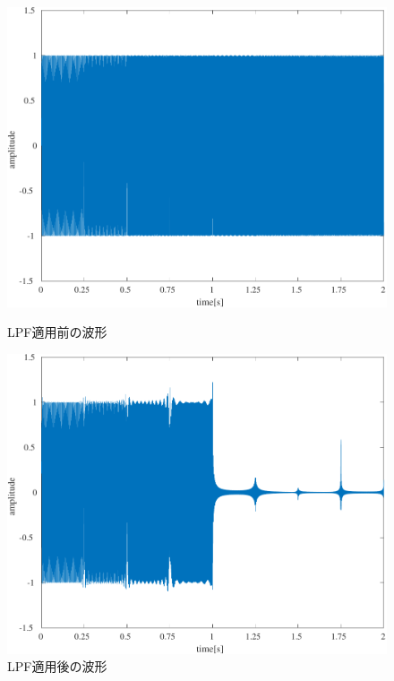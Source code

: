 \begin{figure}[h]
    \centering
    \begin{minipage}[b]{.3\textwidth}
        \centering
        \includegraphics[keepaspectratio,width=\textwidth]{../../Figures/02_20.pdf}
        \caption{LPF適用前の波形}
        \label{fig:LPF適用前の波形}
    \end{minipage}
    \begin{minipage}[b]{.3\textwidth}
        \centering
        \includegraphics[keepaspectratio,width=\textwidth]{../../Figures/02_22.pdf}
        \caption{LPF適用後の波形}
        \label{fig:LPF適用後の波形}
    \end{minipage}

\end{figure}
